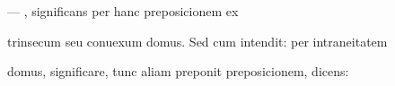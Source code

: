 \renewcommand{\theFancyVerbLine}{04-\arabic{FancyVerbLine}\phantom{a}}

\begin{VerbatimLatin}[firstnumber=56]
— , significans per hanc preposicionem  ex

trinsecum seu conuexum domus. Sed cum intendit: per intraneitatem

domus, significare, tunc aliam preponit preposicionem, dicens: 

\end{VerbatimLatin}


